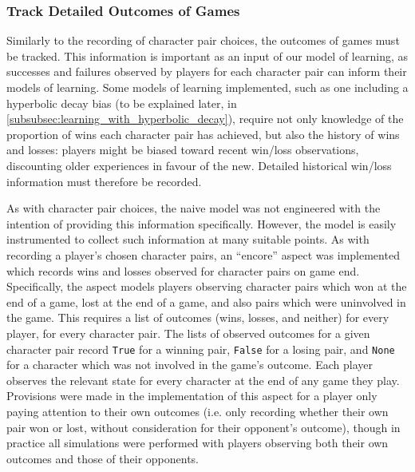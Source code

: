 \subsubsection{Track Detailed Outcomes of
Games}\label{subsubsec:detailed_game_outcome_tracking_aspect} Similarly to the
recording of character pair choices, the outcomes of games must be tracked. This
information is important as an input of our model of learning, as successes and
failures observed by players for each character pair can inform their models of
learning. Some models of learning implemented, such as one including a
hyperbolic decay bias (to be explained later, in
\cref{subsubsec:learning_with_hyperbolic_decay}), require not only knowledge of
the proportion of wins each character pair has achieved, but also the history of
wins and losses: players might be biased toward recent win/loss observations,
discounting older experiences in favour of the new. Detailed historical win/loss
information must therefore be recorded.

As with character pair choices, the naive model was not engineered with the
intention of providing this information specifically. However, the model is
easily instrumented to collect such information at many suitable points. As with
recording a player's chosen character pairs, an ``encore'' aspect was
implemented which records wins and losses observed for character pairs on game
end. Specifically, the aspect models players observing character pairs which won
at the end of a game, lost at the end of a game, and also pairs which were
uninvolved in the game. This requires a list of outcomes (wins, losses, and
neither) for every player, for every character pair. The lists of observed
outcomes for a given character pair record \lstinline{True} for a winning pair,
\lstinline{False} for a losing pair, and \lstinline{None} for a character which
was not involved in the game's outcome. Each player observes the relevant state
for every character at the end of any game they play. Provisions were made in
the implementation of this aspect for a player only paying attention to their
own outcomes (i.e. only recording whether their own pair won or lost, without
consideration for their opponent's outcome), though in practice all simulations
were performed with players observing both their own outcomes and those of their
opponents.

